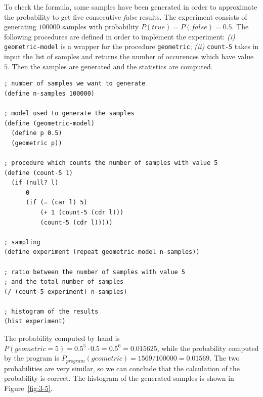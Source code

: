 To check the formula, some samples have been generated in order to approximate the probability to get five consecutive 
\textit{false} results. The experiment consists of generating $ 100000 $ samples with probability 
$ P(true) = P(false) = 0.5 $.
The following procedures are defined in order to implement the experiment: \textit{(i)} \texttt{geometric-model} is a wrapper for the 
procedure \texttt{geometric}; \textit{(ii)} \texttt{count-5} takes in input the list of samples and returns the number of
occurences which have value $ 5 $.
Then the samples are generated and the statistics are computed.
\begin{lstlisting}[caption={Experiment to approximate the probability of getting the first occurence of success at the sixth trial},
    captionpos=b]
; number of samples we want to generate
(define n-samples 100000)

; model used to generate the samples
(define (geometric-model)
  (define p 0.5)
  (geometric p))

; procedure which counts the number of samples with value 5
(define (count-5 l)
  (if (null? l)
      0
      (if (= (car l) 5)
          (+ 1 (count-5 (cdr l)))
          (count-5 (cdr l)))))

; sampling
(define experiment (repeat geometric-model n-samples))

; ratio between the number of samples with value 5
; and the total number of samples
(/ (count-5 experiment) n-samples)

; histogram of the results
(hist experiment)
\end{lstlisting}
The probability computed by hand is $ P(geometric = 5) = 0.5^{5} \cdot 0.5 = 0.5^{6} = 0.015625 $, while the probability computed
by the program is $ P_{program}(geometric) = 1569/100000 = 0.01569 $.
The two probabilities are very similar, so we can conclude that the calculation of the probability is correct.
The histogram of the generated samples is shown in Figure~\ref{fig:3-5}.

